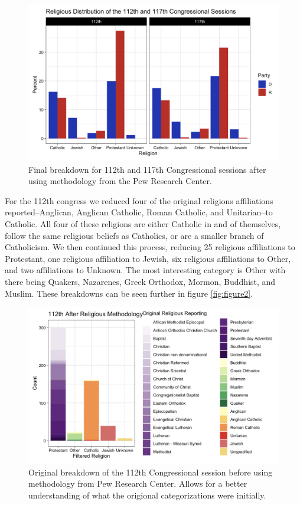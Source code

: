 \documentclass[Royal,times,sageh]{sagej}
\begin{document}
\begin{figure}

{\centering \includegraphics[width=0.95\linewidth]{images/percent_graph} 

}

\caption{Final breakdown for 112th and 117th Congressional sessions after using methodology from the Pew Research Center.\label{fig:figure1}}\label{fig:unnamed-chunk-1}
\end{figure}

For the 112th congress we reduced four of the original religions
affiliations reported--Anglican, Anglican Catholic, Roman Catholic, and
Unitarian--to Catholic. All four of these religions are either Catholic
in and of themselves, follow the same religious beliefs as Catholics, or
are a smaller branch of Catholicism. We then continued this process,
reducing 25 religious affiliations to Protestant, one religious
affiliation to Jewish, six religious affiliations to Other, and two
affiliations to Unknown. The most interesting category is Other with
there being Quakers, Nazarenes, Greek Orthodox, Mormon, Buddhist, and
Muslim. These breakdowns can be seen further in figure
\ref{fig:figure2}.

\begin{figure}

{\centering \includegraphics[width=0.95\linewidth]{images/112th_religious} 

}

\caption{Original breakdown of the 112th Congressional session before using methodology from Pew Research Center. Allows for a better understanding of what the origional categorizations were initially.\label{fig:figure2}}\label{fig:unnamed-chunk-2}
\end{figure}
\end{document}

